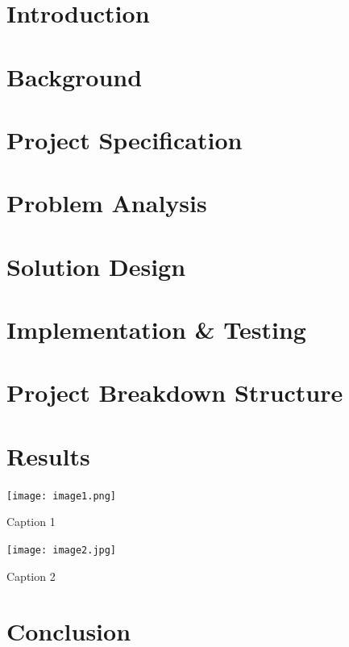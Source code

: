 \documentclass[a4paper, 12pt]{article}
\begin{document}
\newpage

\section*{Introduction}


\section*{Background}


\section*{Project Specification}


\section*{Problem Analysis}


\section*{Solution Design}


\section*{Implementation \& Testing}

\section*{Project Breakdown Structure}


\newpage

\section*{Results}

\begin{minipage}[H]{0.45\textwidth}
    \centering
    \texttt{[image: image1.png]}
    \caption{Caption 1}
\end{minipage}
\hfill
\begin{minipage}[H]{0.45\textwidth}
    \centering
    \texttt{[image: image2.jpg]}
    \caption{Caption 2}
\end{minipage}


\section*{Conclusion}
\end{document}
